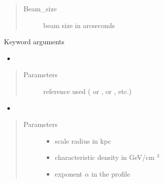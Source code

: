 \documentclass[letterpaper,10pt,english]{sphinxmanual}
\begin{document}
\begin{fulllineitems}
\begin{quote}
\begin{description}
\begin{itemize}
\end{itemize}

\item[{Beam\_size}] \leavevmode
\sphinxAtStartPar
beam size in arcseconds

\end{description}\end{quote}

\sphinxAtStartPar
Keyword arguments
\begin{itemize}
\item {} 
\sphinxAtStartPar
{}

\end{itemize}
\begin{quote}\begin{description}
\item[{Parameters}] \leavevmode
\sphinxAtStartPar
{} \textendash{} reference used ( or \sphinxcode{\sphinxupquote{\textquotesingle{}1309.2641\textquotesingle{}}},  or \sphinxcode{\sphinxupquote{\textquotesingle{}1408.0002\textquotesingle{}}}, etc.)

\end{description}\end{quote}
\begin{itemize}
\item {} 
\sphinxAtStartPar
{}

\end{itemize}
\begin{quote}\begin{description}
\item[{Parameters}] \leavevmode\begin{itemize}
\item {} 
\sphinxAtStartPar
{} \textendash{} scale radius in kpc

\item {} 
\sphinxAtStartPar
{} \textendash{} characteristic density in GeV/cm \({}^3\)

\item {} 
\sphinxAtStartPar
{} \textendash{} exponent \(\alpha\) in the {\hyperref[\detokenize{diffsph.profiles:diffsph.profiles.templates.hdz}]{}} profile


\end{itemize}
\end{description}
\end{quote}
\end{fulllineitems}
\end{document}
